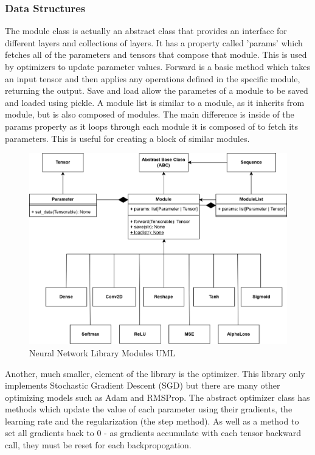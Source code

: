 \documentclass{article}
\begin{document}
    \subsubsection{Data Structures}

    The module class is actually an abstract class that provides an interface for different layers and collections of layers.
    It has a property called 'params' which fetches all of the parameters and tensors that compose that module. This is used by optimizers to
    update parameter values. Forward is a basic method which takes an input tensor and then applies any operations defined in the specific
    module, returning the output. Save and load allow the parametes of a module to be saved and loaded using pickle. A module list is similar to a module,
    as it inherits from module, but is also composed of modules. The main difference is inside of the params property as it loops through each
    module it is composed of to fetch its parameters. This is useful for creating a block of similar modules.

    \begin{figure}[h]
        \centering
        \includegraphics[scale=0.23]{NNLib-Design-UML.drawio.png}
        \caption{Neural Network Library Modules UML}
    \end{figure}

    Another, much smaller, element of the library is the optimizer. This library only implements Stochastic Gradient Descent
    (SGD) but there are many other optimizing models such as Adam and RMSProp. The abstract optimizer class has methods which update
    the value of each parameter using their gradients, the learning rate and the regularization (the step method). As well as a method to
    set all gradients back to 0 - as gradients accumulate with each tensor backward call, they must be reset for each backpropogation.
\end{document}
